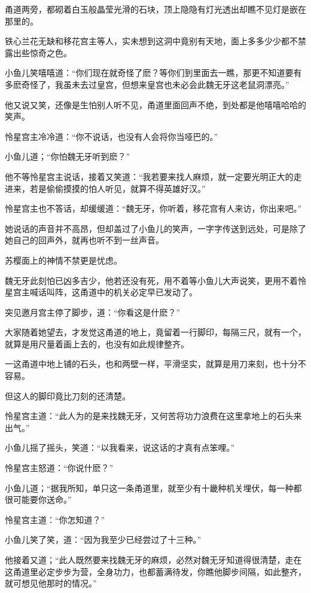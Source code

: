 \documentclass[12pt,oneside]{book}
\begin{document}
甬道两旁，都砌着白玉般晶莹光滑的石块，顶上隐隐有灯光透出却瞧不见灯是嵌在那里的。

铁心兰花无缺和移花宫主等人，实未想到这洞中竟别有天地，面上多多少少都不禁露出些惊奇之色。

小鱼儿笑嘻嘻道：``你们现在就奇怪了麽？等你们到里面去一瞧，那更不知道要有多麽奇怪了，我虽未去过皇宫，但想来皇宫也未必会此魏无牙这老鼠洞漂亮。''

他又说又笑，还像是生怕别人听不见，甬道里面回声不绝，到处都是他嘻嘻哈哈的笑声。

怜星宫主冷冷道：``你不说话，也没有人会将你当哑巴的。''

小鱼儿道；``你怕魏无牙听到麽？''

他不等怜星宫主说话，接着又笑道：``我若要来找人麻烦，就一定要光明正大的走进来，若是偷偷摸摸的怕人听见，就算不得英雄好汉。''

怜星宫主也不答话，却缓缓道：``魏无牙，你听着，移花宫有人来访，你出来吧。''

她说话的声音并不高昂，但却盖过了小鱼儿的笑声，一字字传送到远处，可是除了她自己的回声外，就再也听不到一丝声音。

苏樱面上的神情不禁更是忧虑。

魏无牙此刻怕已凶多吉少，他若还没有死，用不着等小鱼儿大声说笑，更用不着怜星宫主喊话叫阵，这甬道中的机关必定早已发动了。

突见邀月宫主停了脚步，道：``你看这是什麽？''

大家随着她望去，才发觉这甬道的地上，竟留着一行脚印，每隔三尺，就有一个，就算是用尺量着画上去的，也没有如此规律整齐。

一这甬道中地上铺的石头，也和两壁一样，平滑坚实，就算是用刀来刻，也十分不容易。

但这人的脚印竟比刀刻的还清楚。

怜星宫主道：``此人为的是来找魏无牙，又何苦将功力浪费在这里拿地上的石头来出气。''

小鱼儿摇了摇头，笑道：``以我看来，说这话的才真有点笨哩。''

怜星宫主怒道：``你说什麽？''

小鱼儿道；``据我所知，单只这一条甬道里，就至少有十畿种机关埋伏，每一种都很可能要你送命。''

怜星宫主道：``你怎知道？''

小鱼儿笑了笑，道：``因为我至少已经尝过了十三种。''

他接着又道；``此人既然要来找魏无牙的麻烦，必然对魏无牙知道得很清楚，走在这甬道里必定步步为营，全身功力，也都蓄满待发，你瞧他脚步间隔，如此整齐，就可想见他那时的情况。''
\end{document}
